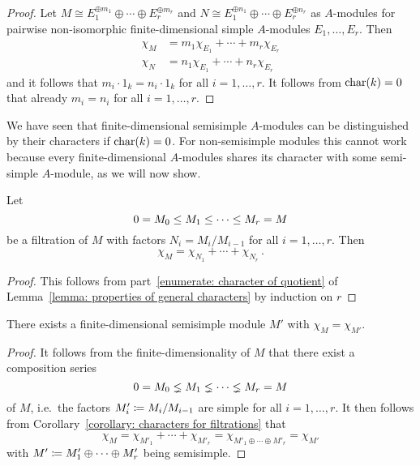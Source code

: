 \begin{proof}
  Let $M \cong E_1^{\oplus m_1} \oplus \dotsb \oplus E_r^{\oplus m_r}$ and $N \cong E_1^{\oplus n_1} \oplus \dotsb \oplus E_r^{\oplus n_r}$ as $A$-modules for pairwise non-isomorphic finite-dimensional simple $A$-modules $E_1, \dotsc, E_r$.
  Then
  \begin{align*}
    \chi_M &= m_1 \chi_{E_1} + \dotsb + m_r \chi_{E_r}  \\
    \chi_N &= n_1 \chi_{E_1} + \dotsb + n_r \chi_{E_r}
  \end{align*}
  and it follows that $m_i \cdot 1_k = n_i \cdot 1_k$ for all $i = 1, \dotsc, r$.
  It follows from $\operatorname{char}(k) = 0$ that already $m_i = n_i$ for all $i = 1, \dotsc, r$.
\end{proof}


\begin{fluff}
  We have seen that finite-dimensional semisimple $A$-modules can be distinguished by their characters if $\operatorname{char}(k) = 0$.
  For non-semisimple modules this cannot work because every finite-dimensional $A$-modules shares its character with some semi-simple $A$-module, as we will now show.
\end{fluff}


\begin{corollary}
  \label{corollary: characters for filtrations}
  Let
  \[
                0
    =           M_0
    \leq  M_1
    \leq  \dotsb
    \leq  M_r
    =           M
  \]
  be a filtration of $M$ with factors $N_i = M_i/M_{i-1}$ for all $i = 1, \dotsc, r$.
  Then
  \[
      \chi_M
    = \chi_{N_1} + \dotsb + \chi_{N_r} \,.
  \]
\end{corollary}


\begin{proof}
  This follows from part~\ref*{enumerate: character of quotient} of Lemma~\ref{lemma: properties of general characters} by induction on $r$
\end{proof}


\begin{corollary}
  There exists a finite-dimensional semisimple module $M'$ with $\chi_M = \chi_{M'}$.
\end{corollary}


\begin{proof}
  It follows from the finite-dimensionality of $M$ that there exist a composition series
  \[
                  0
    =             M_0
    \lneq   M_1
    \lneq   \dotsb
    \lneq   M_r
    =             M
  \]
  of $M$, i.e.\ the factors $M'_i \coloneqq M_i/M_{i-1}$ are simple for all $i = 1, \dotsc, r$.
  It then follows from Corollary~\ref{corollary: characters for filtrations} that
  \[
      \chi_M
    = \chi_{M'_1} + \dotsb + \chi_{M'_r}
    = \chi_{M'_1 \oplus \dotsb \oplus M'_r}
    = \chi_{M'}
  \]
  with $M' \coloneqq M'_1 \oplus \dotsb \oplus M'_r$ being semisimple.
\end{proof}





